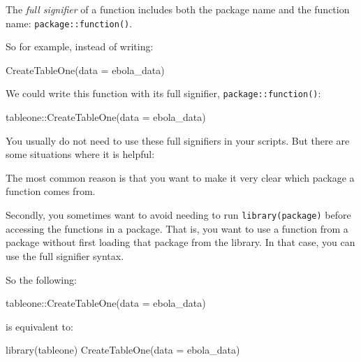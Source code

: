 \documentclass[
  letterpaper,
  DIV=11,
  numbers=noendperiod]{scrreprt}
\newenvironment{Shaded}{\begin{snugshade}}{\end{snugshade}}
\newcommand{\AttributeTok}[1]{\textcolor[rgb]{0.40,0.45,0.13}{#1}}
\newcommand{\FunctionTok}[1]{\textcolor[rgb]{0.28,0.35,0.67}{#1}}
\newcommand{\NormalTok}[1]{\textcolor[rgb]{0.00,0.23,0.31}{#1}}
\newcommand{\SpecialCharTok}[1]{\textcolor[rgb]{0.37,0.37,0.37}{#1}}
\begin{document}
The \emph{full signifier} of a function includes both the package name
and the function name: \texttt{package::function()}.

So for example, instead of writing:

\begin{Shaded}
\begin{Highlighting}[]
\FunctionTok{CreateTableOne}\NormalTok{(}\AttributeTok{data =}\NormalTok{ ebola\_data)}
\end{Highlighting}
\end{Shaded}

We could write this function with its full signifier,
\texttt{package::function()}:

\begin{Shaded}
\begin{Highlighting}[]
\NormalTok{tableone}\SpecialCharTok{::}\FunctionTok{CreateTableOne}\NormalTok{(}\AttributeTok{data =}\NormalTok{ ebola\_data)}
\end{Highlighting}
\end{Shaded}

You usually do not need to use these full signifiers in your scripts.
But there are some situations where it is helpful:

The most common reason is that you want to make it very clear which
package a function comes from.

Secondly, you sometimes want to avoid needing to run
\texttt{library(package)} before accessing the functions in a package.
That is, you want to use a function from a package without first loading
that package from the library. In that case, you can use the full
signifier syntax.

So the following:

\begin{Shaded}
\begin{Highlighting}[]
\NormalTok{tableone}\SpecialCharTok{::}\FunctionTok{CreateTableOne}\NormalTok{(}\AttributeTok{data =}\NormalTok{ ebola\_data)}
\end{Highlighting}
\end{Shaded}

is equivalent to:

\begin{Shaded}
\begin{Highlighting}[]
\FunctionTok{library}\NormalTok{(tableone)}
\FunctionTok{CreateTableOne}\NormalTok{(}\AttributeTok{data =}\NormalTok{ ebola\_data)}
\end{Highlighting}
\end{Shaded}
\end{document}
